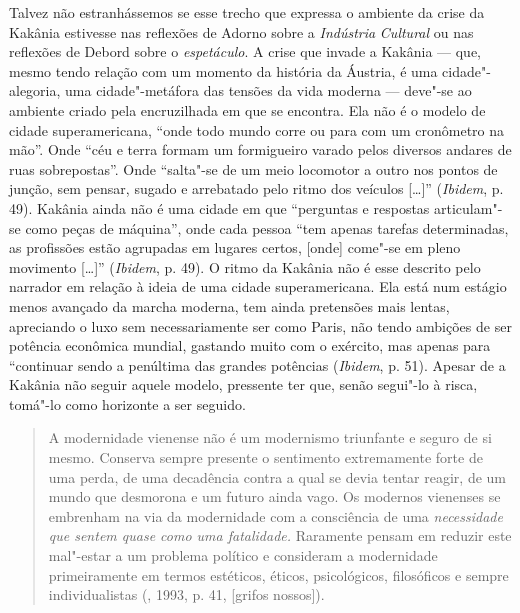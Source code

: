Talvez não estranhássemos se esse trecho que expressa o ambiente da
crise da Kakânia estivesse nas reflexões de Adorno sobre a
\emph{Indústria} \emph{Cultural} ou nas reflexões de Debord
sobre o \emph{espetáculo}. A crise que invade a Kakânia --- que,
mesmo tendo relação com um momento da história da Áustria, é uma
cidade"-alegoria, uma cidade"-metáfora das tensões da vida moderna ---
deve"-se ao ambiente criado pela encruzilhada em que se encontra. Ela não é o modelo de cidade
superamericana, ``onde todo mundo corre ou para com um cronômetro na
mão''. Onde ``céu e terra formam um formigueiro varado pelos diversos
andares de ruas sobrepostas''. Onde ``salta"-se de um meio locomotor a
outro nos pontos de junção, sem pensar, sugado e arrebatado pelo ritmo
dos veículos [\ldots{}]'' (\emph{Ibidem}, p. 49). Kakânia ainda não é uma cidade
em que ``perguntas e respostas articulam"-se como peças de máquina'',
onde cada pessoa ``tem apenas tarefas determinadas, as profissões estão
agrupadas em lugares certos, [onde] come"-se em pleno movimento
[\ldots{}]'' (\emph{Ibidem}, p. 49). O ritmo da Kakânia não é esse descrito
pelo narrador em relação à ideia de uma cidade superamericana. Ela está
num estágio menos avançado da marcha moderna, tem ainda pretensões mais
lentas, apreciando o luxo sem necessariamente ser como Paris, não tendo
ambições de ser potência econômica mundial, gastando muito com o
exército, mas apenas para ``continuar sendo a penúltima das grandes
potências (\emph{Ibidem}, p. 51). Apesar de a Kakânia não seguir aquele
modelo, pressente ter que, senão segui"-lo à risca, tomá"-lo como
horizonte a ser seguido.

\begin{quote}
A modernidade vienense não é um modernismo triunfante e seguro de si
mesmo. Conserva sempre presente o sentimento extremamente forte de uma
perda, de uma decadência contra a qual se devia tentar reagir, de um
mundo que desmorona e um futuro ainda vago. Os modernos vienenses se
embrenham na via da modernidade com a consciência de uma
\emph{necessidade que sentem quase como uma fatalidade.} Raramente
pensam em reduzir este mal"-estar a um problema político e consideram a
modernidade primeiramente em termos estéticos, éticos, psicológicos,
filosóficos e sempre individualistas (, 1993, p. 41, [grifos
nossos]).
\end{quote}


